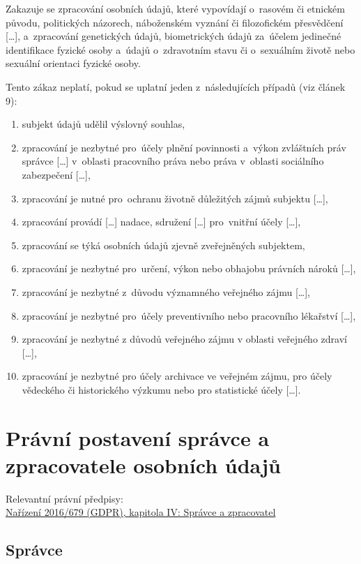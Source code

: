 Zakazuje se zpracování osobních údajů, které vypovídají o~rasovém či etnickém původu, politických názorech, náboženském vyznání či filozofickém přesvědčení [\dots], a~zpracování genetických údajů, biometrických údajů za~účelem jedinečné identifikace fyzické osoby a~údajů o~zdravotním stavu či o~sexuálním životě nebo sexuální orientaci fyzické osoby.

Tento zákaz neplatí, pokud se uplatní jeden z~následujících případů (viz článek 9):

\begin{enumerate}[label=\alph*)]
\item subjekt údajů udělil výslovný souhlas,
\item zpracování je nezbytné pro~účely plnění povinnosti a~výkon zvláštních práv správce [\dots] v~oblasti pracovního práva nebo práva v~oblasti sociálního zabezpečení [\dots],
\item zpracování je nutné pro~ochranu životně důležitých zájmů subjektu [\dots],
\item zpracování provádí [\dots] nadace, sdružení [\dots] pro~vnitřní účely [\dots],
\item zpracování se týká osobních údajů zjevně zveřejněných subjektem,
\item zpracování je nezbytné pro~určení, výkon nebo obhajobu právních nároků [\dots],
\item zpracování je nezbytné z~důvodu významného veřejného zájmu [\dots],
\item zpracování je nezbytné pro~účely preventivního nebo pracovního lékařství [\dots],
\item zpracování je nezbytné z důvodů veřejného zájmu v oblasti veřejného zdraví [\dots],
\item zpracování je nezbytné pro účely archivace ve veřejném zájmu, pro účely vědeckého či historického výzkumu nebo pro statistické účely [\dots].
\end{enumerate}

\clearpage
\section{Právní postavení správce a zpracovatele osobních údajů}

{}Relevantní právní předpisy:
\\\href{https://eur-lex.europa.eu/legal-content/CS/ALL/?uri=CELEX:32016R0679#d1e3011-1-1
}{Nařízení 2016/679 (GDPR), kapitola IV: Správce a zpracovatel}

\subsection{Správce}

